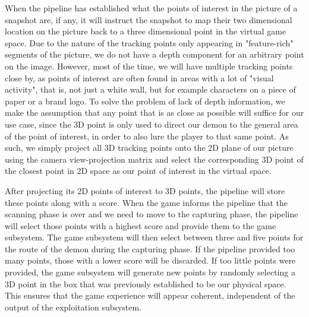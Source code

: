 When the pipeline has established what the points of interest in the picture of a snapshot are, if any, it will instruct the snapshot to map their two dimensional location on the picture back to a three dimensional point in the virtual game space. Due to the nature of the tracking points only appearing in "feature-rich" segments of the picture, we do not have a depth component for an arbitrary point on the image. However, most of the time, we will have multiple tracking points close by, as points of interest are often found in areas with a lot of "visual activity", that is, not just a white wall, but for example characters on a piece of paper or a brand logo. To solve the problem of lack of depth information, we make the assumption that any point that is as close as possible will suffice for our use case, since the 3D point is only used to direct our demon to the general area of the point of interest, in order to also lure the player to that same point. As such, we simply project all 3D tracking points onto the 2D plane of our picture using the camera view-projection matrix and select the corresponding 3D point of the closest point in 2D space as our point of interest in the virtual space.

After projecting its 2D points of interest to 3D points, the pipeline will store these points along with a score. When the game informs the pipeline that the scanning phase is over and we need to move to the capturing phase, the pipeline will select those points with a highest score and provide them to the game subsystem. The game subsystem will then select between three and five points for the route of the demon during the capturing phase. If the pipeline provided too many points, those with a lower score will be discarded. If too little points were provided, the game subsystem will generate new points by randomly selecting a 3D point in the box that was previously established to be our physical space. This ensures that the game experience will appear coherent, independent of the output of the exploitation subsystem.
